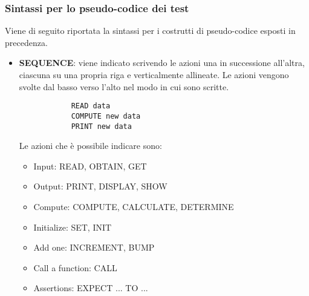 	
	\subsubsection{Sintassi per lo pseudo-codice dei test}
	Viene di seguito riportata la sintassi per i costrutti di pseudo-codice esposti in precedenza.
	
	\begin{itemize}
	\item \textbf{SEQUENCE}: viene indicato scrivendo le azioni una in successione all'altra, ciascuna su una propria riga e verticalmente allineate. Le azioni vengono svolte dal basso verso l'alto nel modo in cui sono scritte. 
	
		\begin{verbatim}
			READ data
			COMPUTE new data
			PRINT new data
		\end{verbatim}	 
		Le azioni che è possibile indicare sono:
		\begin{itemize}
			\item Input: READ, OBTAIN, GET
			\item Output: PRINT, DISPLAY, SHOW
			\item Compute: COMPUTE, CALCULATE, DETERMINE
			\item Initialize: SET, INIT
			\item Add one: INCREMENT, BUMP
			\item Call a function: CALL
			\item Assertions: EXPECT ... TO ...
		\end{itemize}
		

\end{itemize}
